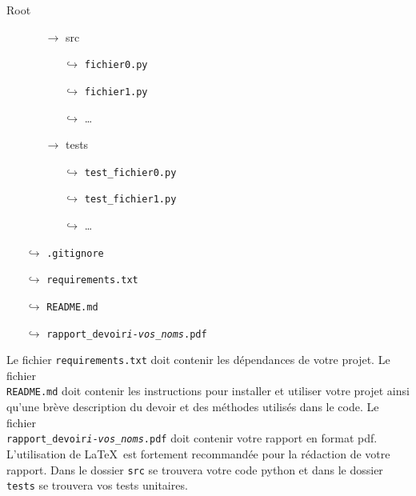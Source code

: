 \documentclass[12pt, letterpaper]{article}
\begin{document}
\noindent Root
\begin{itemize}
    \item[]
        \begin{itemize}
            \item[$\rightarrow$] src
                \begin{itemize}
                    \item[$\hookrightarrow$] \texttt{fichier0.py}
                    \item[$\hookrightarrow$] \texttt{fichier1.py}
                    \item[$\hookrightarrow$] \dots
              \end{itemize}
        \end{itemize}
  \item[]
  \begin{itemize}
    \item[$\rightarrow$] tests
    \begin{itemize}
      \item[$\hookrightarrow$] \texttt{test\_fichier0.py}
      \item[$\hookrightarrow$] \texttt{test\_fichier1.py}
      \item[$\hookrightarrow$] \dots
    \end{itemize}
  \end{itemize}
  \item[$\hookrightarrow$] \texttt{.gitignore}
  \item[$\hookrightarrow$] \texttt{requirements.txt}
  \item[$\hookrightarrow$] \texttt{README.md}
  \item[$\hookrightarrow$] \texttt{rapport\_devoir\emph{i}-\emph{vos\_noms}.pdf}
\end{itemize}

\bigskip

\noindent Le fichier \texttt{requirements.txt} doit contenir les dépendances de votre projet.
Le fichier \\\texttt{README.md} doit contenir les instructions pour installer et utiliser votre projet ainsi
qu'une brève description du devoir et des méthodes utilisés dans le code.
Le fichier \\\texttt{rapport\_devoir\emph{i}-\emph{vos\_noms}.pdf} doit contenir votre rapport en format pdf.
L'utilisation de \LaTeX\ est fortement recommandée pour la rédaction de votre rapport.
Dans le dossier \texttt{src} se trouvera votre code python et dans le dossier \texttt{tests} se trouvera vos tests
unitaires.
\end{document}
